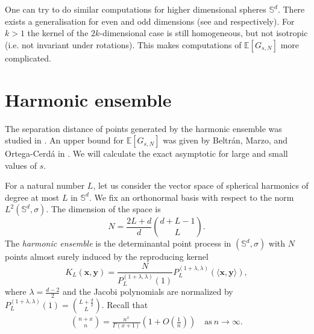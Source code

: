 \documentclass[a4paper,11pt]{amsart}
\begin{document}
One can try to do similar computations for higher dimensional spheres $\mathbb{S}^d$. There exists a generalisation for even and odd dimensions (see \cite{Beltrn2019} and  \cite{Beltrn2018} respectively). For $k>1$ the kernel of the $2k$-dimensional case is still homogeneous, but not isotropic (i.e. not invariant under rotations). This makes computations of $\mathbb{E}[G_{s,N}]$ more complicated.






\section{Harmonic ensemble}

The separation distance of points generated by the harmonic ensemble was studied in \cite{Beltrn2016}. An upper bound for $\mathbb{E}[G_{s,N}]$ was given by Beltrán, Marzo, and Ortega-Cerdá in \cite[Proposition 4]{Beltrn2016}. We will calculate the exact asymptotic for large and small values of $s$.

For a natural number $L$, let us consider the vector space of spherical harmonics of degree at most $L$ in $\mathbb{S}^d$. We fix an orthonormal basis with respect to the norm $L^2(\mathbb{S}^d,\sigma)$. The dimension of the space is
$$N=\frac{2L+d}{d}\binom{d+L-1}{L}.$$
The \textit{harmonic ensemble} is the determinantal point process in $(\mathbb{S}^d,\sigma)$ with
$N$ points almost surely induced by the reproducing kernel
$$K_L(\mathbf{x},\mathbf{y})=\frac{N}{P_L^{(1+\lambda,\lambda)}(1)}P_L^{(1+\lambda,\lambda)}(\langle \mathbf{x},\mathbf{y}\rangle),$$
where $\lambda=\frac{d-2}{2}$ and the Jacobi polynomials are normalized by $P_L^{(1+\lambda,\lambda)}(1)=\binom{L+\frac{d}{2}}{L}$. Recall that 
\begin{align}\label{binom}
    \binom{n+x}{n}=\frac{n^x}{\Gamma(x+1)}\left(1+O\left(\frac{1}{n}\right)\right)\quad \text{as}\ n\rightarrow \infty.
\end{align}  
\end{document}
